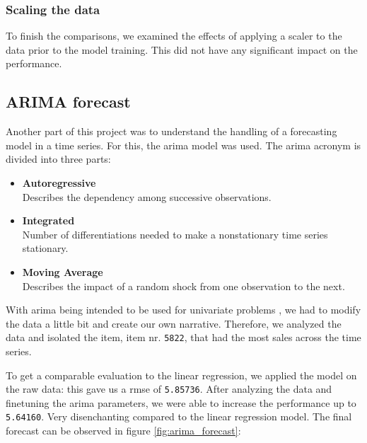 \subsubsection{Scaling the data }

To finish the comparisons, we examined the effects of applying a scaler to the data prior to the model training. This did not have any significant impact on the performance.


\subsection{ARIMA forecast}

Another part of this project was to understand the handling of a forecasting model in a time series. 
For this, the \acrfull{arima} model was used. The \acrshort{arima} acronym is divided into three parts: \cite{MultivariateStatisticsARIMA}

\begin{itemize}
	\vspace*{-3mm}
	\item \textbf{Autoregressive}\\
	Describes the dependency among successive observations.
	\vspace*{-3mm}
	\item \textbf{Integrated}\\
	Number of differentiations needed to make a nonstationary time series stationary.
	\vspace*{-3mm}
	\item \textbf{Moving Average}\\
	Describes the impact of a random shock from one observation to the next.
\end{itemize}

With \acrshort{arima} being intended to be used for univariate problems \cite{Gron2017HandsOnML}, we had to modify the data a little bit and create our own narrative. Therefore, we analyzed the data and isolated the item, item nr. \texttt{5822}, that had the most sales across the time series.

To get a comparable evaluation to the linear regression, we applied the model on the raw data: this gave us a \acrshort{rmse} of \texttt{5.85736}. After analyzing the data and finetuning the \acrshort{arima} parameters, we were able to increase the performance up to \texttt{5.64160}. Very disenchanting compared to the linear regression model. The final forecast can be observed in figure \ref{fig:arima_forecast}:

